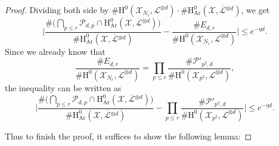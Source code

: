 \documentclass[JEP,XML,SOM,Unicode,published]{cedram}
\theoremstyle{plain}
\theoremstyle{definition}
\newcommand{\ho}{\mathrm{H}}
\newcommand{\X}{\mathcal{X}}
\newcommand{\Li}{\overline{\mathcal{L}}{}}
\newcommand{\li}{\mathcal{L}}
\begin{document}
\begin{proof}
Dividing both side by $\#\ho^0(\X_{N_r}, \li^{\otimes d})\cdot\#\ho^0_{\mathrm{Ar}}(\X, \Li^{\otimes d})$, we get
\[
\biggl| \frac{\#\bigl(\bigcap_{p\leq r}\mathcal{P}_{d,p}\cap \ho^0_{\mathrm{Ar}}(\X, \Li^{\otimes d})\bigr)}{\#\ho^0_{\mathrm{Ar}}(\X, \Li^{\otimes d})} -\frac{\#E_{d,r}}{\#\ho^0(\X_{N_r}, \li^{\otimes d})} \biggr|\leq e^{-\eta d}.
\]
Since we already know that
\[
\frac{\#E_{d,r}}{\#\ho^0(\X_{N_r}, \li^{\otimes d})}=\prod_{p\leq r} \frac{\#\mathcal{P}'_{p^2,d}}{\#\ho^0(\X_{p^2}, \li^{\otimes d})},
\]
the inequality can be written as
\[
\biggl| \frac{\#\bigl(\bigcap_{p\leq r}\mathcal{P}_{d,p}\cap \ho^0_{\mathrm{Ar}}(\X, \Li^{\otimes d})\bigr)}{\#\ho^0_{\mathrm{Ar}}(\X, \Li^{\otimes d})} -\prod_{p\leq r} \frac{\#\mathcal{P}'_{p^2,d}}{\#\ho^0(\X_{p^2}, \li^{\otimes d})} \biggr|\leq e^{-\eta d}.
\]

Thus to finish the proof, it suffices to show the following lemma:


\end{proof}
\end{document}
